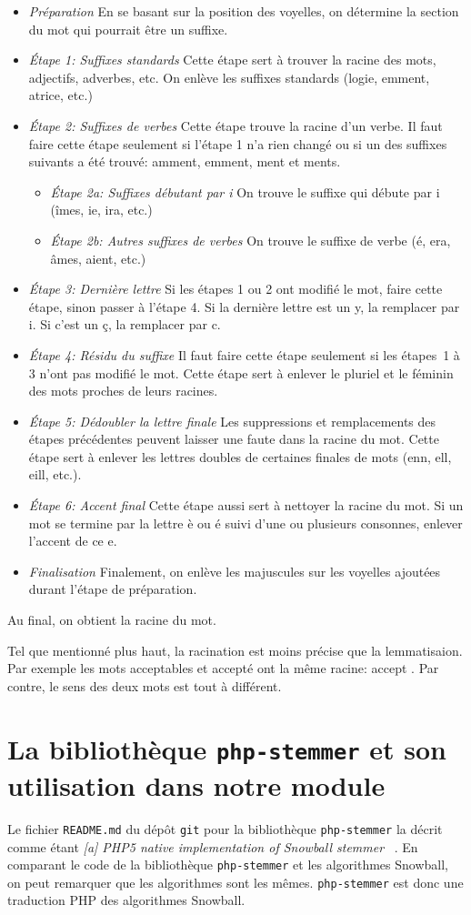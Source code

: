 \newcommand{\ETAPE}[1]{\item{\emph{#1}}}

\begin{itemize}
\ETAPE{Pr\'eparation}
En se basant sur la position des voyelles, on d\'etermine la section du mot qui pourrait \^etre un suffixe.
\ETAPE{\'Etape 1: Suffixes standards}
Cette \'etape sert \`a trouver la racine des mots, adjectifs, adverbes, etc.
On enl\`eve les suffixes standards (logie, emment, atrice, etc.)
\ETAPE{\'Etape 2: Suffixes de verbes}
Cette \'etape trouve la racine d'un verbe.
Il faut faire cette \'etape seulement si l'\'etape 1 n'a rien chang\'e ou si un des suffixes suivants a \'et\'e trouv\'e: amment, emment, ment et ments.
\begin{itemize}
\ETAPE{\'Etape 2a: Suffixes d\'ebutant par i}
On trouve le suffixe qui d\'ebute par i (\^imes, ie, ira, etc.)
\ETAPE{\'Etape 2b: Autres suffixes de verbes}
On trouve le suffixe de verbe (\'e, era, \^ames, aient, etc.)
\end{itemize}
\ETAPE{\'Etape 3: Derni\`ere lettre}
Si les \'etapes 1 ou 2 ont modifi\'e le mot, faire cette \'etape, sinon passer \`a l'\'etape 4.
Si la derni\`ere lettre est un y, la remplacer par i.
Si c'est un \c{c}, la remplacer par c.
\ETAPE{\'Etape 4: R\'esidu du suffixe}
Il faut faire cette \'etape seulement si les \'etapes~1 \`a 3 n'ont pas modifi\'e le mot.
Cette \'etape sert \`a enlever le pluriel et le f\'eminin des mots proches de leurs racines.
\ETAPE{\'Etape 5: D\'edoubler la lettre finale}
Les suppressions et remplacements des \'etapes pr\'ec\'edentes peuvent laisser une faute dans la racine du mot.
Cette \'etape sert \`a enlever les lettres doubles de certaines finales de mots (enn, ell, eill, etc.).
\ETAPE{\'Etape 6: Accent final}
Cette \'etape aussi sert \`a nettoyer la racine du mot.
Si un mot se termine par la lettre {\`e ou \'e} suivi d'une ou plusieurs consonnes, enlever l'accent de ce {e}.
\ETAPE{Finalisation}
Finalement, on enl\`eve les majuscules sur les voyelles ajout\'ees durant l'\'etape de pr\'eparation.
\end{itemize}
Au final, on obtient la racine du mot.

Tel que mentionn\'e plus haut, la racination est moins pr\'ecise que la lemmatisaion.
Par exemple les mots \og acceptables \fg{} et \og accept\'e \fg{} ont la m\^eme racine: \og accept \fg{}.
Par contre, le sens des deux mots est tout \`a diff\'erent.


\section{La biblioth\`eque \texttt{php-stemmer} et son utilisation dans notre module}
\label{chap:phpstemmer}
Le fichier \texttt{README.md} du d\'ep\^ot \texttt{git} pour la biblioth\`eque \texttt{php-stemmer} la d\'ecrit comme \'etant \og \textit{[a] PHP5 native implementation of Snowball stemmer} \fg{}~\cite{phpstemmer}.
%
En comparant le code de la biblioth\`eque \texttt{php-stemmer} et les algorithmes Snowball, on peut remarquer que les algorithmes sont les m\^emes.
\texttt{php-stemmer} est donc une traduction PHP des algorithmes Snowball.

